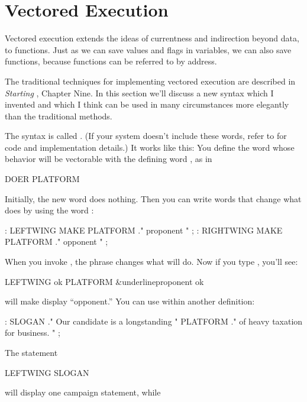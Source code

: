 \section{Vectored Execution}

Vectored execution extends the ideas of currentness and indirection
beyond data, to functions. Just as we can save values and flags in
variables, we can also save functions, because functions can be referred to
by address.

The traditional techniques for implementing vectored execution are
described in \emph{Starting \Forth{}}, Chapter Nine. In this section we'll
discuss a new syntax which I invented and which I think can be used in many
circumstances more elegantly than the traditional methods.

The syntax is called . (If your system doesn't include
these words, refer to  for code and implementation details.) It
works like this: You define the word whose behavior will be vectorable
with the defining word , as in

\begin{Code}
DOER PLATFORM
\end{Code}
Initially, the new word  does nothing. Then you can write
words that change what  does by using the word :

\begin{Code}
: LEFTWING   MAKE PLATFORM  ." proponent " ;
: RIGHTWING  MAKE PLATFORM  ." opponent " ;
\end{Code}
When you invoke , the phrase  changes
what  will do. Now if you type , you'll see:

\begin{Code}[commandchars=\&\{\}]
LEFTWING ok
PLATFORM &underline{proponent ok}
\end{Code}
 will make  display ``opponent.'' You can use
 within another definition:

\begin{Code}
: SLOGAN   ." Our candidate is a longstanding " PLATFORM
   ." of heavy taxation for business. " ;
\end{Code}
The statement

\begin{Code}
LEFTWING SLOGAN
\end{Code}
will display one campaign statement, while

